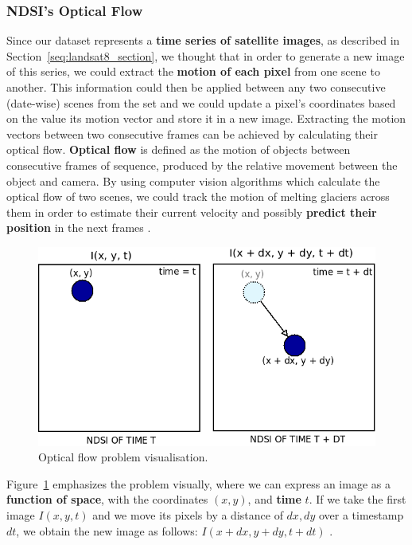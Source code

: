 \documentclass[11pt, a4paper]{report}
\begin{document}
	\subsubsection{NDSI's Optical Flow}
	\label{seq:ndsi_motion_matrix}
	Since our dataset represents a \textbf{time series of satellite images}, as described in Section~\ref{seq:landsat8_section}, we thought that in order to generate a new image of this series, we could extract the \textbf{motion of each pixel} from one scene to another. This information could then be applied between any two consecutive (date-wise) scenes from the set and we could update a pixel's coordinates based on the value its motion vector and store it in a new image.
	Extracting the motion vectors between two consecutive frames can be achieved by calculating their optical flow. \textbf{Optical flow} is defined as the motion of objects between consecutive frames of sequence, produced by the relative movement between the object and camera. By using computer vision algorithms which calculate the optical flow of two scenes, we could track the motion of melting glaciers across them in order to estimate their current velocity and possibly \textbf{predict their position} in the next frames \cite{opticalflow}.
	\begin{figure}[h]
		\centering
		\includegraphics[scale=0.6]{../images/optical_flow_schema.png}
		\caption{Optical flow problem visualisation.}
		\label{fig:optical_flow_example}
	\end{figure}
	
	Figure~\ref{fig:optical_flow_example} emphasizes the problem visually, where we can express an image as a \textbf{function of space}, with the coordinates \textbf{\((x, y)\)}, and \textbf{time} \textbf{\(t\)}. If we take the first image\textbf{ \(I(x, y, t)\)} and we move its pixels by a distance of \textbf{\(dx, dy\)} over a timestamp \textbf{\(dt\)}, we obtain the new image as follows: \textbf{\(I(x + dx, y + dy, t + dt)\)} \cite{orb}.
	
\end{document}
